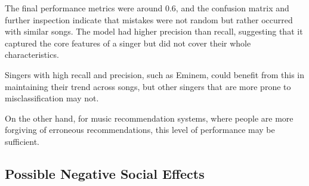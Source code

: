 \documentclass[a4paper,11pt]{article}
\begin{document}




The final performance metrics were around 0.6, and the confusion matrix and further inspection indicate that mistakes were not random but rather occurred with similar songs.
The model had higher precision than recall, suggesting that it captured the core features of a singer but did not cover their whole characteristics.

Singers with high recall and precision, such as Eminem, could benefit from this in maintaining their trend across songs,
but other singers that are more prone to misclassification may not. 

On the other hand, for music recommendation systems, where people are more forgiving of erroneous recommendations, this level of performance may be sufficient.

\subsection{Possible Negative Social Effects}
\end{document}
